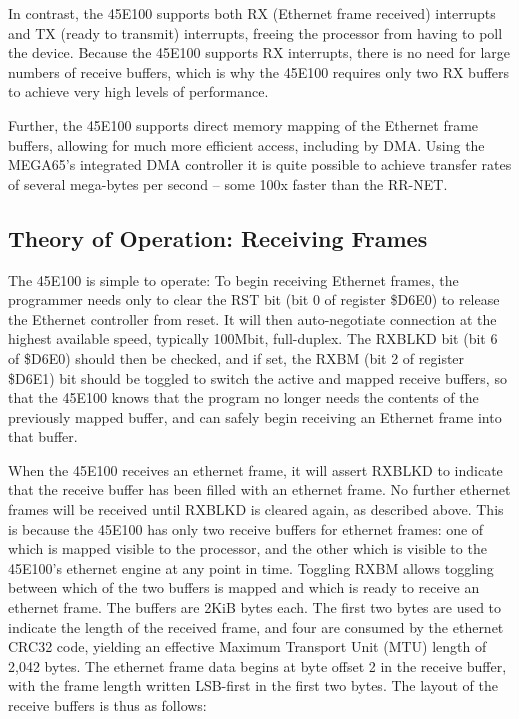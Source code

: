 In contrast, the 45E100 supports both RX (Ethernet frame received) interrupts and TX
(ready to transmit) interrupts, freeing the processor from having to poll
the device. Because the 45E100 supports RX interrupts, there is no need for large
numbers of receive buffers, which is why the 45E100 requires only two RX buffers
to achieve very high levels of performance.

Further, the 45E100 supports direct memory mapping of the
Ethernet frame buffers, allowing for much more efficient access, including
by DMA.  Using the MEGA65's integrated DMA controller it is quite possible
to achieve transfer rates of several mega-bytes per second -- some 100x
faster than the RR-NET.

\subsection{Theory of Operation: Receiving Frames}

The 45E100 is simple to operate: To begin receiving Ethernet frames, the programmer
needs only to clear the RST bit (bit 0 of register \$D6E0) to release the
Ethernet controller from reset.  It will then auto-negotiate connection at
the highest available speed, typically 100Mbit, full-duplex.  The RXBLKD bit (bit 6 of \$D6E0)
should then be checked, and if set, the RXBM (bit 2 of register \$D6E1) bit should be toggled to switch
the active and mapped receive buffers, so that the 45E100 knows that the
program no longer needs the contents of the previously mapped buffer, and can
safely begin receiving an Ethernet frame into that buffer.

When the 45E100 receives an ethernet frame, it will assert RXBLKD to indicate that the receive
buffer has been filled with an ethernet frame.  No further ethernet frames will be received until
RXBLKD is cleared again, as described above. This is because the 45E100 has only two receive buffers
for ethernet frames: one of which is mapped visible to the processor, and the other which is visible
to the 45E100's ethernet engine at any point in time.  Toggling RXBM allows toggling between which
of the two buffers is mapped and which is ready to receive an ethernet frame.  The buffers are 2KiB
bytes each.  The first two bytes are used to indicate the length of the received frame, and four
are consumed by the ethernet CRC32 code, yielding an effective Maximum Transport Unit (MTU) length
of 2,042 bytes.  The ethernet frame data begins at byte offset 2 in the receive buffer, with the
frame length written LSB-first in the first two bytes.  The layout of the receive buffers is thus as follows:

